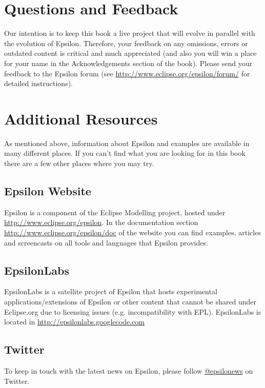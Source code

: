 \section{Questions and Feedback}

Our intention is to keep this book a live project that will evolve in parallel with the evolution of Epsilon. Therefore, your feedback on any omissions, errors or outdated content is critical and much appreciated (and also you will win a place for your name in the Acknowledgements section of the book). Please send your feedback to the Epsilon forum  (see \url{http://www.eclipse.org/epsilon/forum/} for detailed instructions).

\section{Additional Resources}

As mentioned above, information about Epsilon and examples are available in many different places. If you can't find what you are looking for in this book there are a few other places where you may try.

\subsection{Epsilon Website}
Epsilon is a component of the Eclipse Modelling project, hosted under \url{http://www.eclipse.org/epsilon}. In the documentation section \url{http://www.eclipse.org/epsilon/doc} of the website you can find examples, articles and screencasts on all tools and languages that Epsilon provides.

\subsection{EpsilonLabs}

EpsilonLabs is a satellite project of Epsilon that hosts experimental applications/extensions of Epsilon or other content that cannot be shared under Eclipse.org due to licensing issues (e.g. incompatibility with EPL). EpsilonLabs is located in \url{http://epsilonlabs.googlecode.com}

\subsection{Twitter}
To keep in touch with the latest news on Epsilon, please follow \href{http://twitter.com/#!/epsilonews}{@epsilonews} on Twitter.